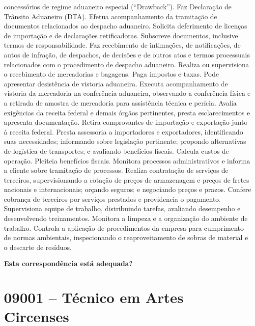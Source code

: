 \documentclass[
]{article}
\begin{document}
concessórios de regime aduaneiro especial (``Drawback''). Faz Declaração
de Trânsito Aduaneiro (DTA). Efetua acompanhamento da tramitação de
documentos relacionados ao despacho aduaneiro. Solicita deferimento de
licenças de importação e de declarações retificadoras. Subscreve
documentos, inclusive termos de responsabilidade. Faz recebimento de
intimações, de notificações, de autos de infração, de despachos, de
decisões e de outros atos e termos processuais relacionados com o
procedimento de despacho aduaneiro. Realiza ou supervisiona o
recebimento de mercadorias e bagagens. Paga impostos e taxas. Pode
apresentar desistência de vistoria aduaneira. Executa acompanhamento de
vistoria da mercadoria na conferência aduaneira, observando a
conferência física e a retirada de amostra de mercadoria para
assistência técnica e perícia. Avalia exigências da receita federal e
demais órgãos pertinentes, presta esclarecimentos e apresenta
documentação. Retira comprovantes de importação e exportação junto à
receita federal. Presta assessoria a importadores e exportadores,
identificando suas necessidades; informando sobre legislação pertinente;
propondo alternativas de logística de transportes; e avaliando
benefícios fiscais. Calcula custos de operação. Pleiteia benefícios
fiscais. Monitora processos administrativos e informa a cliente sobre
tramitação de processos. Realiza contratação de serviços de terceiros,
supervisionando a cotação de preços de armazenagem e preços de fretes
nacionais e internacionais; orçando seguros; e negociando preços e
prazos. Confere cobrança de terceiros por serviços prestados e
providencia o pagamento. Supervisiona equipe de trabalho, distribuindo
tarefas, avaliando desempenho e desenvolvendo treinamentos. Monitora a
limpeza e a organização do ambiente de trabalho. Controla a aplicação de
procedimentos da empresa para cumprimento de normas ambientais,
inspecionando o reaproveitamento de sobras de material e o descarte de
resíduos.

\begin{Form}
\textbf{Esta correspondência está adequada?} \\ 
\end{Form}

\newpage
\section{ 09001 -- Técnico em Artes Circenses }
\end{document}
